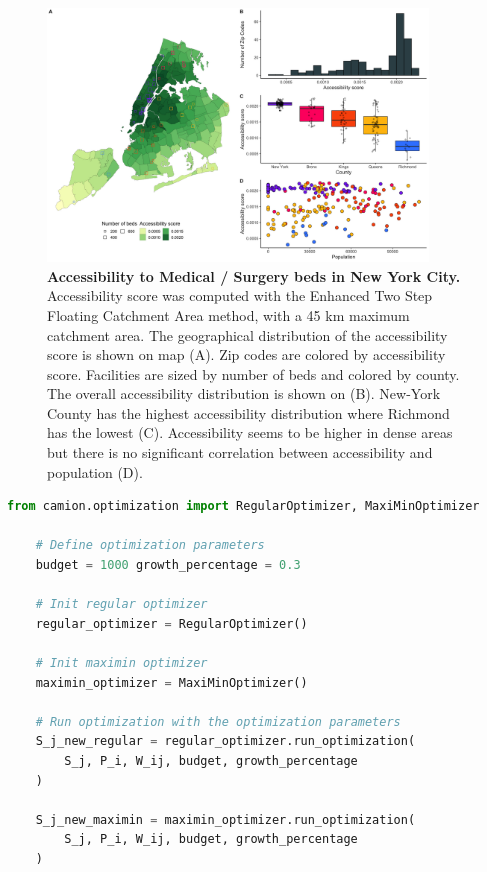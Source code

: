 \begin{figure}[H]
    \includegraphics[width=0.9\textwidth]{images/camion-ny/fig2.png}
    \centering
    \caption{ \textbf{Accessibility to Medical / Surgery beds in New York City.}
        Accessibility score was computed with the Enhanced Two Step Floating
        Catchment Area method, with a 45 km maximum catchment area. The
        geographical distribution of the accessibility score is shown on map
        (A). Zip codes are colored by accessibility score. Facilities are sized
        by number of beds and colored by county. The overall accessibility
        distribution is shown on (B). New-York County has the highest
        accessibility distribution where Richmond has the lowest (C).
        Accessibility seems to be higher in dense areas but there is no
        significant correlation between accessibility and population (D). }
    \label{fig:camion-ny-accessibility}
\end{figure}

\begin{minipage}{\textwidth}
    \begin{lstlisting}[language=Python, caption=Optimize accessibility with \ac{camion}]
    from camion.optimization import RegularOptimizer, MaxiMinOptimizer

    # Define optimization parameters
    budget = 1000 growth_percentage = 0.3

    # Init regular optimizer
    regular_optimizer = RegularOptimizer()

    # Init maximin optimizer
    maximin_optimizer = MaxiMinOptimizer()

    # Run optimization with the optimization parameters
    S_j_new_regular = regular_optimizer.run_optimization(
        S_j, P_i, W_ij, budget, growth_percentage
    )

    S_j_new_maximin = maximin_optimizer.run_optimization(
        S_j, P_i, W_ij, budget, growth_percentage
    )
    \end{lstlisting}
\end{minipage}

